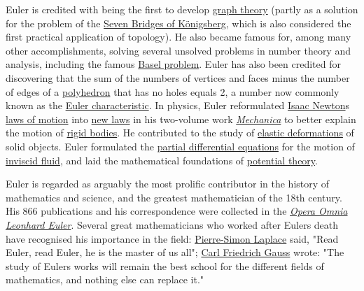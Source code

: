 Euler is credited with being the first to develop \href{https://en.wikipedia.org/wiki/Graph_theory}{graph theory} (partly as a solution for the problem of the \href{https://en.wikipedia.org/wiki/Seven_Bridges_of_Königsberg}{Seven Bridges of Königsberg}, which is also considered the first practical application of topology). He also became famous for, among many other accomplishments, solving several unsolved problems in number theory and analysis, including the famous \href{https://en.wikipedia.org/wiki/Basel_problem}{Basel problem}. Euler has also been credited for discovering that the sum of the numbers of vertices and faces minus the number of edges of a \href{https://en.wikipedia.org/wiki/Polyhedron}{polyhedron} that has no holes equals 2, a number now commonly known as the \href{https://en.wikipedia.org/wiki/Euler_characteristic}{Euler characteristic}. In physics, Euler reformulated \href{https://en.wikipedia.org/wiki/Isaac_Newton}{Isaac Newton}\textquotesingle s \href{https://en.wikipedia.org/wiki/Newton's_laws_of_motion}{laws of motion} into \href{https://en.wikipedia.org/wiki/Euler's_laws_of_motion}{new laws} in his two-volume work \emph{\href{https://en.wikipedia.org/wiki/Mechanica}{Mechanica}} to better explain the motion of \href{https://en.wikipedia.org/wiki/Rigid_bodies}{rigid bodies}. He contributed to the study of \href{https://en.wikipedia.org/wiki/Euler–Bernoulli_beam_theory}{elastic deformations} of solid objects. Euler formulated the \href{https://en.wikipedia.org/wiki/Euler_equations_(fluid_dynamics)}{partial differential equations} for the motion of \href{https://en.wikipedia.org/wiki/Inviscid_flow}{inviscid fluid}, and laid the mathematical foundations of \href{https://en.wikipedia.org/wiki/Potential_theory}{potential theory}.

Euler is regarded as arguably the most prolific contributor in the history of mathematics and science, and the greatest mathematician of the 18th century. His 866 publications and his correspondence were collected in the \emph{\href{https://en.wikipedia.org/wiki/Opera_Omnia_Leonhard_Euler}{Opera Omnia Leonhard Euler}}. Several great mathematicians who worked after Euler\textquotesingle s death have recognised his importance in the field: \href{https://en.wikipedia.org/wiki/Pierre-Simon_Laplace}{Pierre-Simon Laplace} said, "Read Euler, read Euler, he is the master of us all"; \href{https://en.wikipedia.org/wiki/Carl_Friedrich_Gauss}{Carl Friedrich Gauss} wrote: "The study of Euler\textquotesingle s works will remain the best school for the different fields of mathematics, and nothing else can replace it."



